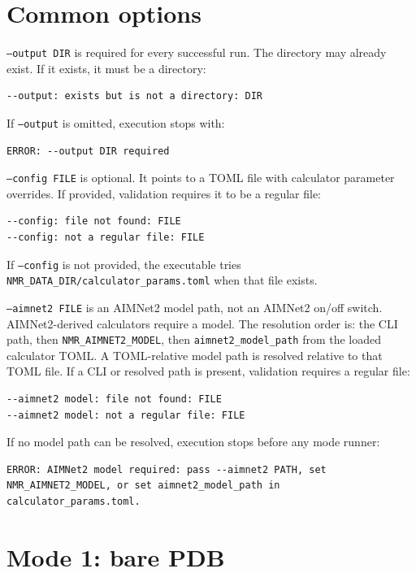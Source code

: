 \documentclass[11pt]{article}
\begin{document}
\section{Common options}

\texttt{--output DIR} is required for every successful run. The directory may
already exist. If it exists, it must be a directory:

\begin{lstlisting}
--output: exists but is not a directory: DIR
\end{lstlisting}

If \texttt{--output} is omitted, execution stops with:

\begin{lstlisting}
ERROR: --output DIR required
\end{lstlisting}

\texttt{--config FILE} is optional. It points to a TOML file with calculator
parameter overrides. If provided, validation requires it to be a regular file:

\begin{lstlisting}
--config: file not found: FILE
--config: not a regular file: FILE
\end{lstlisting}

If \texttt{--config} is not provided, the executable tries
\texttt{NMR\_DATA\_DIR/calculator\_params.toml} when that file exists.

\texttt{--aimnet2 FILE} is an AIMNet2 model path, not an AIMNet2 on/off
switch. AIMNet2-derived calculators require a model. The resolution order is:
the CLI path, then \texttt{NMR\_AIMNET2\_MODEL}, then
\texttt{aimnet2\_model\_path} from the loaded calculator TOML. A TOML-relative
model path is resolved relative to that TOML file. If a CLI or resolved path
is present, validation requires a regular file:

\begin{lstlisting}
--aimnet2 model: file not found: FILE
--aimnet2 model: not a regular file: FILE
\end{lstlisting}

If no model path can be resolved, execution stops before any mode runner:

\begin{lstlisting}
ERROR: AIMNet2 model required: pass --aimnet2 PATH, set NMR_AIMNET2_MODEL, or set aimnet2_model_path in calculator_params.toml.
\end{lstlisting}

\section{Mode 1: bare PDB}
\end{document}
